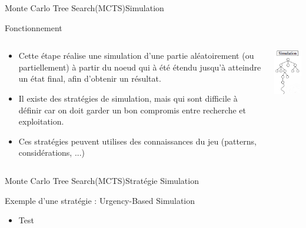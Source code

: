 \begin{frame}{Monte Carlo Tree Search(MCTS)}{Simulation}
	\begin{block}{Fonctionnement}
		\begin{columns}
			\begin{column}{7cm}
				\begin{itemize}
					\item Cette étape réalise une simulation d'une partie aléatoirement (ou partiellement) à partir du noeud qui à été étendu jusqu'à atteindre un état final, afin d'obtenir un résultat.
					\item Il existe des stratégies de simulation, mais qui sont difficile à définir car on doit garder un bon compromis entre recherche et exploitation.
					\item Ces stratégies peuvent utilises des connaissances du jeu (patterns, considérations, ...)
				\end{itemize}
			\end{column}
			\begin{column}{4cm}
				\includegraphics[width=3cm]{ressources/Simulation.png}
			\end{column}
		\end{columns}
	\end{block}
\end{frame}

\begin{frame}{Monte Carlo Tree Search(MCTS)}{Stratégie Simulation}
	\begin{block}{Exemple d'une stratégie : Urgency-Based Simulation}
		\begin{itemize}
			\item Test
		\end{itemize}
	\end{block}
\end{frame}

